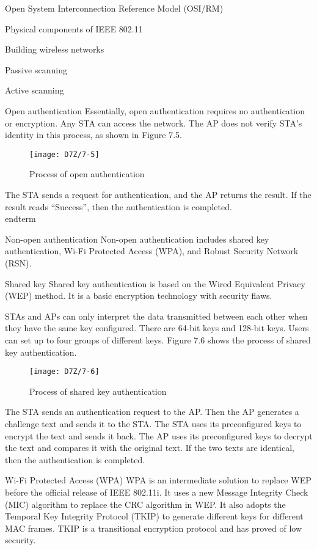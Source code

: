 \documentclass[a4paper,12pt]{book}
\begin{document}
\begin{term}{Open System Interconnection Reference Model (OSI/RM)}
\begin{term}{Physical components of IEEE 802.11}
\begin{term}{Building wireless networks}
\begin{term}{Passive scanning}
\begin{term}{Active scanning}
\begin{term}{Open authentication}
    Essentially, open authentication requires no authentication or encryption. Any STA can access the network. The AP does not verify STA’s identity in this process, as shown in Figure 7.5.

    \begin{figure}[!h]
        \centering
        \texttt{[image: D7Z/7-5]}
        \caption{Process of open authentication}
    \end{figure}

    The STA sends a request for authentication, and the AP returns the result. If the result reads “Success”, then the authentication is completed.
\\end{term}{}

\begin{term}{Non-open authentication}
    Non-open authentication includes shared key authentication, Wi-Fi Protected Access (WPA), and Robust Security Network (RSN).

    \parskip 6pt
    \begin{secterm}{Shared key}
        Shared key authentication is based on the Wired Equivalent Privacy (WEP) method. It is a basic encryption technology with security flaws.
        
        STAs and APs can only interpret the data transmitted between each other when they have the same key configured. There are 64-bit keys and 128-bit keys. Users can set up to four groups of different keys. Figure 7.6 shows the process of shared key authentication.

        \begin{figure}[!h]
            \centering
            \texttt{[image: D7Z/7-6]}
            \caption{Process of shared key authentication}
        \end{figure}

        The STA sends an authentication request to the AP. Then the AP generates a challenge text and sends it to the STA. The STA uses its preconfigured keys to encrypt the text and sends it back. The AP uses its preconfigured keys to decrypt the text and compares it with the original text. If the two texts are identical, then the authentication is completed.
    \end{secterm}

    \begin{secterm}{Wi-Fi Protected Access (WPA)}
        WPA is an intermediate solution to replace WEP before the official release of IEEE 802.11i. It uses a new Message Integrity Check (MIC) algorithm to replace the CRC algorithm in WEP. It also adopts the Temporal Key Integrity Protocol (TKIP) to generate different keys for different MAC frames. TKIP is a transitional encryption protocol and has proved of low security.
    \end{secterm}


\end{term}
\end{term}
\end{term}
\end{term}
\end{term}
\end{term}
\end{term}
\end{document}
